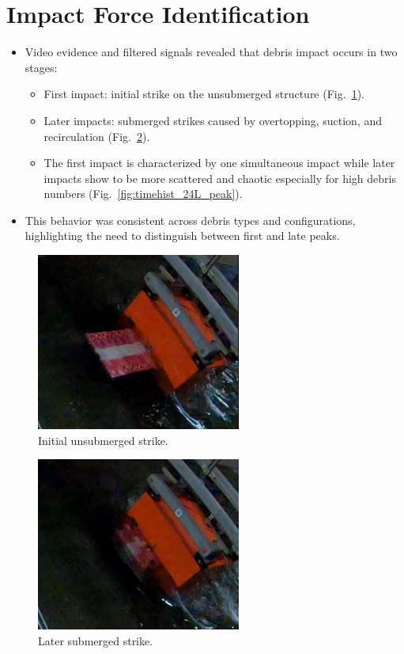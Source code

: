 \documentclass{article}
\begin{document}
\section{Impact Force Identification}
\begin{itemize}
    \item Video evidence and filtered signals revealed that debris impact occurs in two stages:
    \begin{itemize}
        \item First impact: initial strike on the unsubmerged structure (Fig.~\ref{fig:first_impact}). 
        \item Later impacts: submerged strikes caused by overtopping, suction, and recirculation (Fig.~\ref{fig:second_impact}).
        \item  The first impact is characterized by one simultaneous impact while later impacts show to be more scattered and chaotic especially for high debris numbers (Fig.~\ref{fig:timehist_24L_peak}).
    \end{itemize}
    \item This behavior was consistent across debris types and configurations, highlighting the need to distinguish between first and late peaks.
\end{itemize}
\begin{figure}[htbp]
    \centering
    \includegraphics[width=0.6\textwidth]{first_impact.jpg}
    \caption{Initial unsubmerged strike.}
    \label{fig:first_impact}
\end{figure}

\begin{figure}[htbp]
    \centering
    \includegraphics[width=0.6\textwidth]{second_impact.jpg}
    \caption{Later submerged strike.}
    \label{fig:second_impact}
\end{figure}
\end{document}
